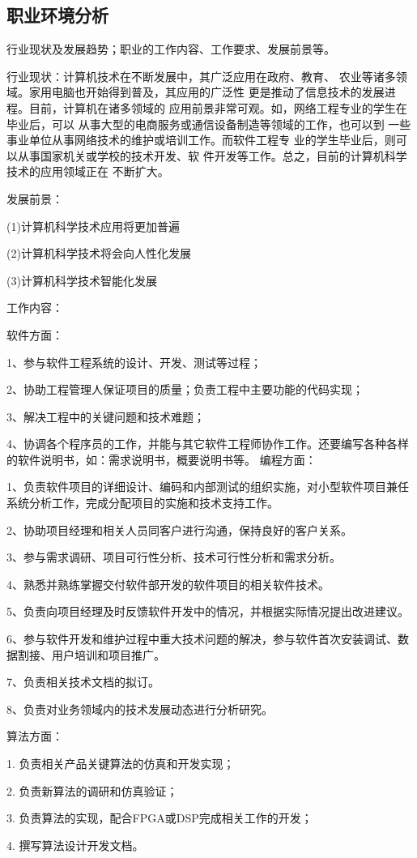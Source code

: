 \documentclass{article}
\begin{document}
\subsection{职业环境分析}
\par
行业现状及发展趋势；职业的工作内容、工作要求、发展前景等。\par
行业现状：计算机技术在不断发展中，其广泛应用在政府、教育、 农业等诸多领域。家用电脑也开始得到普及，其应用的广泛性 更是推动了信息技术的发展进程。目前，计算机在诸多领域的 应用前景非常可观。如，网络工程专业的学生在毕业后，可以 从事大型的电商服务或通信设备制造等领域的工作，也可以到 一些事业单位从事网络技术的维护或培训工作。而软件工程专 业的学生毕业后，则可以从事国家机关或学校的技术开发、软 件开发等工作。总之，目前的计算机科学技术的应用领域正在 不断扩大。\par
发展前景：\par(1)计算机科学技术应用将更加普遍\par
(2)计算机科学技术将会向人性化发展\par
(3)计算机科学技术智能化发展\par
工作内容：\par
软件方面： \par
1、参与软件工程系统的设计、开发、测试等过程；\par
2、协助工程管理人保证项目的质量；负责工程中主要功能的代码实现；\par
3、解决工程中的关键问题和技术难题；\par
4、协调各个程序员的工作，并能与其它软件工程师协作工作。还要编写各种各样的软件说明书，如：需求说明书，概要说明书等。
编程方面：\par
1、负责软件项目的详细设计、编码和内部测试的组织实施，对小型软件项目兼任系统分析工作，完成分配项目的实施和技术支持工作。\par
2、协助项目经理和相关人员同客户进行沟通，保持良好的客户关系。\par
3、参与需求调研、项目可行性分析、技术可行性分析和需求分析。\par
4、熟悉并熟练掌握交付软件部开发的软件项目的相关软件技术。\par
5、负责向项目经理及时反馈软件开发中的情况，并根据实际情况提出改进建议。\par
6、参与软件开发和维护过程中重大技术问题的解决，参与软件首次安装调试、数据割接、用户培训和项目推广。\par
7、负责相关技术文档的拟订。\par
8、负责对业务领域内的技术发展动态进行分析研究。\par
算法方面：\par
1.     负责相关产品关键算法的仿真和开发实现；\par
2.     负责新算法的调研和仿真验证；\par
3.     负责算法的实现，配合FPGA或DSP完成相关工作的开发；\par
4.     撰写算法设计开发文档。\par
\end{document}
